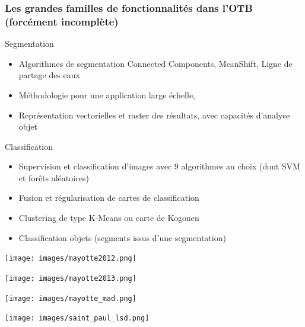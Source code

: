 \documentclass[8pt]{beamer}
\begin{document}
\begin{frame}
\frametitle{Les grandes familles de fonctionnalités dans l'OTB (forcément incomplète)}
\begin{block}{Segmentation}
\begin{itemize}
\item Algorithmes de segmentation Connected Components, MeanShift, Ligne de partage des eaux
\item Méthodologie pour une application large échelle,
\item Représentation vectorielles et raster des résultats, avec capacités d'analyse objet
\end{itemize}
\end{block}

\begin{block}{Classification}
\begin{itemize}
\item Supervision et classification d'images avec 9 algorithmes au choix (dont SVM et forêts aléatoires)
\item Fusion et régularisation de cartes de classification
\item Clustering de type K-Means ou carte de Kogonen
\item Classification objets (segments issus d'une segmentation)
\end{itemize}
\end{block}

\end{frame}

\vspace*{-6.5mm}    
\begin{frame}[plain]
\hspace*{-11mm}
    \texttt{[image: images/mayotte2012.png]}
\end{frame} 

\vspace*{-6.5mm}    
\begin{frame}[plain]
\hspace*{-11mm}
    \texttt{[image: images/mayotte2013.png]}
\end{frame} 

\vspace*{-6.5mm}    
\begin{frame}[plain]
\hspace*{-11mm}
    \texttt{[image: images/mayotte\_mad.png]}
\end{frame} 

\vspace*{-6.5mm}    
\begin{frame}[plain]
\hspace*{-11mm}
\texttt{[image: images/saint\_paul\_lsd.png]}
\end{frame} 
\end{document}
